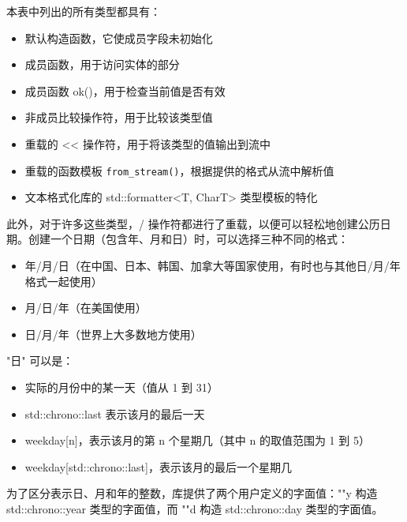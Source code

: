 本表中列出的所有类型都具有：

\begin{itemize}
\item
默认构造函数，它使成员字段未初始化

\item
成员函数，用于访问实体的部分

\item
成员函数 ok()，用于检查当前值是否有效

\item
非成员比较操作符，用于比较该类型值

\item
重载的 <{}< 操作符，用于将该类型的值输出到流中

\item
重载的函数模板 \verb|from_stream()|，根据提供的格式从流中解析值

\item
文本格式化库的 std::formatter<T, CharT> 类型模板的特化
\end{itemize}

此外，对于许多这些类型，/ 操作符都进行了重载，以便可以轻松地创建公历日期。创建一个日期（包含年、月和日）时，可以选择三种不同的格式：

\begin{itemize}
\item
年/月/日（在中国、日本、韩国、加拿大等国家使用，有时也与其他日/月/年格式一起使用）

\item
月/日/年（在美国使用）

\item
日/月/年（世界上大多数地方使用）
\end{itemize}

"日" 可以是：

\begin{itemize}
\item
实际的月份中的某一天（值从 1 到 31）

\item
std::chrono::last 表示该月的最后一天

\item
weekday[n]，表示该月的第 n 个星期几（其中 n 的取值范围为 1 到 5）

\item
weekday[std::chrono::last]，表示该月的最后一个星期几
\end{itemize}

为了区分表示日、月和年的整数，库提供了两个用户定义的字面值：""y 构造 std::chrono::year 类型的字面值，而 ""d 构造 std::chrono::day 类型的字面值。

